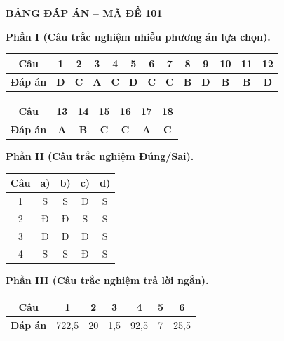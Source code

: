 \vspace{0.4cm}
\noindent\begin{minipage}{\linewidth}
\begin{center}{\large\bfseries\color{red!80!black} BẢNG ĐÁP ÁN -- MÃ ĐỀ 101}\end{center}
\vspace{0.15cm}
\noindent\textbf{Phần I (Câu trắc nghiệm nhiều phương án lựa chọn).}\par\smallskip
\begin{center}
\begin{tabular}{|c|c|c|c|c|c|c|c|c|c|c|c|c|}\hline
\textbf{Câu} & 1 & 2 & 3 & 4 & 5 & 6 & 7 & 8 & 9 & 10 & 11 & 12 \\ \hline
\textbf{Đáp án} & \textbf{D} & \textbf{C} & \textbf{A} & \textbf{C} & \textbf{D} & \textbf{C} & \textbf{C} & \textbf{B} & \textbf{D} & \textbf{B} & \textbf{B} & \textbf{D} \\ \hline
\end{tabular}
\end{center}
\begin{center}
\begin{tabular}{|c|c|c|c|c|c|c|}\hline
\textbf{Câu} & 13 & 14 & 15 & 16 & 17 & 18 \\ \hline
\textbf{Đáp án} & \textbf{A} & \textbf{B} & \textbf{C} & \textbf{C} & \textbf{A} & \textbf{C} \\ \hline
\end{tabular}
\end{center}
\noindent\textbf{Phần II (Câu trắc nghiệm Đúng/Sai).}\par\smallskip
\begin{center}
\begin{tabular}{|c|c|c|c|c|}\hline
\textbf{Câu} & \textbf{a)} & \textbf{b)} & \textbf{c)} & \textbf{d)} \\ \hline
1 & S & S & Đ & S \\ \hline
2 & Đ & Đ & S & S \\ \hline
3 & Đ & Đ & Đ & S \\ \hline
4 & S & S & Đ & S \\ \hline
\end{tabular}
\end{center}
\noindent\textbf{Phần III (Câu trắc nghiệm trả lời ngắn).}\par\smallskip
\begin{center}
\begin{tabular}{|c|c|c|c|c|c|c|}\hline
\textbf{Câu} & 1 & 2 & 3 & 4 & 5 & 6 \\ \hline
\textbf{Đáp án} & 722,5 & 20 & 1,5 & 92,5 & 7 & 25,5 \\ \hline
\end{tabular}
\end{center}
\end{minipage}
